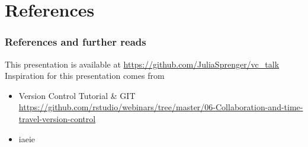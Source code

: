 \documentclass[
t, %
10pt, %
aspectratio=1610, %
ngerman,
english,
]{beamer}
\begin{document}
\section{References}
\begin{frame}
    \frametitle{References and further reads}
    This presentation is available at \url{https://github.com/JuliaSprenger/vc_talk}
    Inspiration for this presentation comes from
    \begin{itemize}
        \item Version Control Tutorial \& GIT \newline \url{https://github.com/rstudio/webinars/tree/master/06-Collaboration-and-time-travel-version-control}
        \item iaeie
    \end{itemize}
\end{frame}
\end{document}
